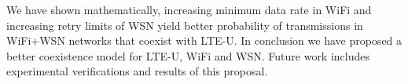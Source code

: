 \documentclass[a4paper]{article}
\begin{document}
We have shown mathematically, increasing minimum data rate in {WiFi} and increasing retry limits of {WSN} yield better probability of transmissions in {WiFi+WSN} networks that coexist with {LTE-U}. In conclusion we have proposed a better coexistence model for {LTE-U}, {WiFi} and {WSN}. Future work includes experimental verifications and results of this proposal.
	\nocite{*}	


\end{document}
